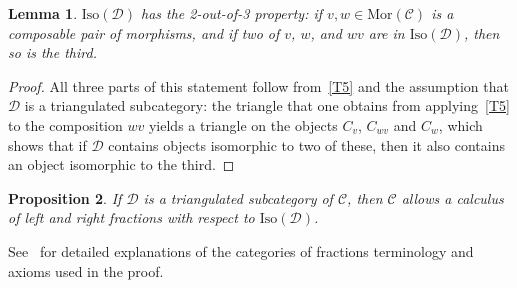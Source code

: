 \documentclass{amsproc}
\newtheorem{prop}{Proposition}[section]
\newtheorem{lem}[prop]{Lemma}
\theoremstyle{definition}
\begin{document}
\begin{lem}
\label{2of3}
${\mathrm{Iso}}({\mathcal{D}})$ has the \emph{2-out-of-3 property}: if $v,w\in{\mathrm{Mor}}({\mathcal{C}})$ is a composable pair of morphisms, and if two of $v$, $w$, and $wv$ are in ${\mathrm{Iso}}({\mathcal{D}})$, then so is the third.
\end{lem}

\begin{proof}
All three parts of this statement follow from~\ref{T5} and the assumption that $\mathcal{D}$ is a triangulated subcategory: the triangle that one obtains from applying~\ref{T5} to the composition $wv$ yields a triangle on the objects $C_v$, $C_{wv}$ and $C_w$, which shows that if ${\mathcal{D}}$ contains objects isomorphic to two of these, then it also contains an object isomorphic to the third.
\end{proof}

\begin{prop}
\label{trisubcatlocal}
If ${\mathcal{D}}$ is a triangulated subcategory of ${\mathcal{C}}$, then ${\mathcal{C}}$ allows a calculus of left and right fractions with respect to ${\mathrm{Iso}}({\mathcal{D}})$.
\end{prop}

See~\cite{Fri1} for detailed explanations of the categories of fractions terminology and axioms used in the proof.
\end{document}

